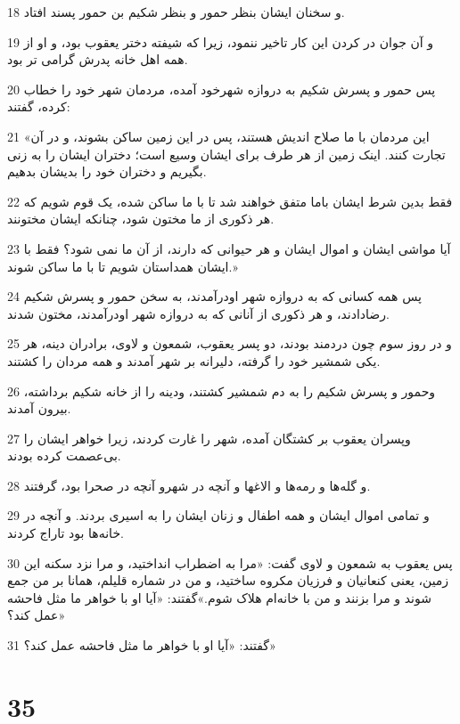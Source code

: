 \par 18 و سخنان ایشان بنظر حمور و بنظر شکیم بن حمور پسند افتاد.
\par 19 و آن جوان در کردن این کار تاخیر ننمود، زیرا که شیفته دختر یعقوب بود، و او از همه اهل خانه پدرش گرامی تر بود.
\par 20 پس حمور و پسرش شکیم به دروازه شهرخود آمده، مردمان شهر خود را خطاب کرده، گفتند:
\par 21 «این مردمان با ما صلاح اندیش هستند، پس در این زمین ساکن بشوند، و در آن تجارت کنند. اینک زمین از هر طرف برای ایشان وسیع است؛ دختران ایشان را به زنی بگیریم و دختران خود را بدیشان بدهیم.
\par 22 فقط بدین شرط ایشان باما متفق خواهند شد تا با ما ساکن شده، یک قوم شویم که هر ذکوری از ما مختون شود، چنانکه ایشان مختونند.
\par 23 آیا مواشی ایشان و اموال ایشان و هر حیوانی که دارند، از آن ما نمی شود؟ فقط با ایشان همداستان شویم تا با ما ساکن شوند.»
\par 24 پس همه کسانی که به دروازه شهر اودرآمدند، به سخن حمور و پسرش شکیم رضادادند، و هر ذکوری از آنانی که به دروازه شهر اودرآمدند، مختون شدند.
\par 25 و در روز سوم چون دردمند بودند، دو پسر یعقوب، شمعون و لاوی، برادران دینه، هر یکی شمشیر خود را گرفته، دلیرانه بر شهر آمدند و همه مردان را کشتند.
\par 26 وحمور و پسرش شکیم را به دم شمشیر کشتند، ودینه را از خانه شکیم برداشته، بیرون آمدند.
\par 27 وپسران یعقوب بر کشتگان آمده، شهر را غارت کردند، زیرا خواهر ایشان را بی‌عصمت کرده بودند.
\par 28 و گله‌ها و رمه‌ها و الاغها و آنچه در شهرو آنچه در صحرا بود، گرفتند.
\par 29 و تمامی اموال ایشان و همه اطفال و زنان ایشان را به اسیری بردند. و آنچه در خانه‌ها بود تاراج کردند.
\par 30 پس یعقوب به شمعون و لاوی گفت: «مرا به اضطراب انداختید، و مرا نزد سکنه این زمین، یعنی کنعانیان و فرزیان مکروه ساختید، و من در شماره قلیلم، همانا بر من جمع شوند و مرا بزنند و من با خانه‌ام هلاک شوم.»گفتند: «آیا او با خواهر ما مثل فاحشه عمل کند؟»
\par 31 گفتند: «آیا او با خواهر ما مثل فاحشه عمل کند؟»
 
\chapter{35}

